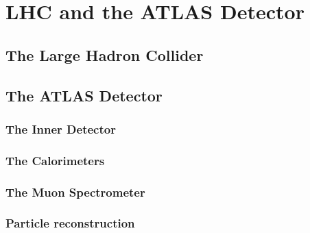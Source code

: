 \chapter[LHC and the ATLAS Detector][LHC and the ATLAS Detector]{LHC and the ATLAS Detector}
\label{ch:detector}

\section{The Large Hadron Collider}\label{sec:lhc}


\section{The ATLAS Detector}\label{sec:atlas}


\subsection{The Inner Detector}\label{sec:id}


\subsection{The Calorimeters}\label{sec:calorimeters}


\subsection{The Muon Spectrometer}\label{sec:muon_spectrometer}


\subsection{Particle reconstruction}\label{sec:reconstruction}

